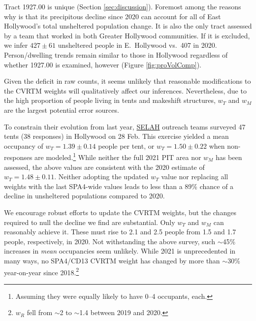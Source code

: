 \documentclass[11pt,twocolumn]{article}
\def\resp{respectively}
\begin{document}
Tract 1927.00 is unique (Section \ref{sec:discussion}). Foremost among the reasons why is that its precipitous 
decline since 2020 can account for all of East Hollywood's total unsheltered population change. It is also the only 
tract assessed by a team that worked in both Greater Hollywood communities. If it is excluded, we infer $427\pm61$ unsheltered 
people in E.~Hollywood vs.\ 407 in 2020. Person/dwelling trends remain similar to those in 
Hollywood regardless of whether 1927.00 is examined, however (Figure \ref{fig:proVolComp}).

Given the deficit in raw counts, it seems unlikely that reasonable modifications to the CVRTM weights 
will qualitatively affect our inferences. Nevertheless, due to the high proportion of people living in tents and 
makeshift structures, $w_{T}$ and $w_{M}$ are the largest potential error sources. 

To constrain their evolution
from last year, \href{https://selahnhc.org}{SELAH} outreach teams surveyed 47 tents (38 responses) 
in Hollywood on 28 Feb. This exercise yielded a mean occupancy of $w_{T}=1.39\pm0.14$ people per tent, 
or $w_{T}=1.50\pm0.22$ when non-responses are modeled.\footnote{Assuming they were equally likely to have 
0--4 occupants, each.} While neither the full 2021 PIT area nor $w_{M}$ has been assessed,
the above values are consistent with the 2020 estimate of $w_{T}=1.48\pm0.11$. Neither adopting the updated 
$w_{T}$ value nor replacing all weights with the last SPA4-wide values leads to less than a
89\% chance of a decline in unsheltered populations compared to 2020. %


We encourage robust efforts to update the CVRTM weights, but the changes required to null the decline we find
are substantial. Only $w_{T}$ and $w_{M}$ can reasonably achieve it. These must rise to 2.1 and 
2.5 people from 1.5 and 1.7 people, \resp, in 2020. Not withstanding the above survey, such $\sim$45\% increases 
in {\it mean} occupancies seem unlikely. While 2021 is unprecedented in many ways, no SPA4/CD13 
CVRTM weight has changed by more than $\sim$30\% year-on-year since 2018.\footnote{$w_{R}$ fell from 
$\sim$2 to $\sim$1.4 between 2019 and 2020.}
\end{document}
